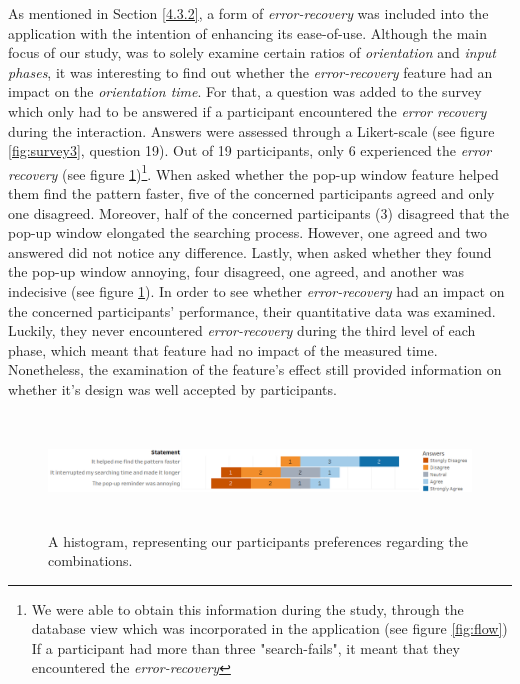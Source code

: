 As mentioned in Section \ref{4.3.2}, a form of \textit{error-recovery} was included into the application with the intention of enhancing its ease-of-use. Although the main focus of our study, was to solely examine certain ratios of \textit{orientation} and \textit{input phases}, it was interesting to find out whether the \textit{error-recovery} feature had an impact on the \textit{orientation time}. For that, a question was added to the survey which only had to be answered if a participant encountered the \textit{error recovery} during the interaction. Answers were assessed through a Likert-scale (see figure \ref{fig:survey3}, question 19). Out of 19 participants, only 6 experienced the \textit{error recovery} (see figure \ref{fig:error})\footnote{We were able to obtain this information during the study, through the database view which was incorporated in the application (see figure \ref{fig:flow}) If a participant had more than three "search-fails", it meant that they encountered the \textit{error-recovery}}. When asked whether the pop-up window feature helped them find the pattern faster, five of the concerned participants agreed and only one disagreed. Moreover, half of the concerned participants (3) disagreed that the pop-up window elongated the searching process. However, one agreed and two answered did not notice any difference. Lastly, when asked whether they found the pop-up window annoying, four disagreed, one agreed, and another was indecisive (see figure \ref{fig:error}). In order to see whether \textit{error-recovery} had an impact on the concerned participants' performance, their quantitative data was examined. Luckily, they never  encountered \textit{error-recovery} during the third level of each phase, which meant that feature had no impact of the measured time. Nonetheless, the examination of the feature's effect still provided information on whether it's design was well accepted by participants. \\


\begin{figure}[t!]
\centering
\includegraphics[width=15cm, height=3cm]{Chapters/graphics/ErrorRecovery.png}
\caption{A histogram, representing our participants preferences regarding the combinations.}
\label{fig:error}
\end{figure}





